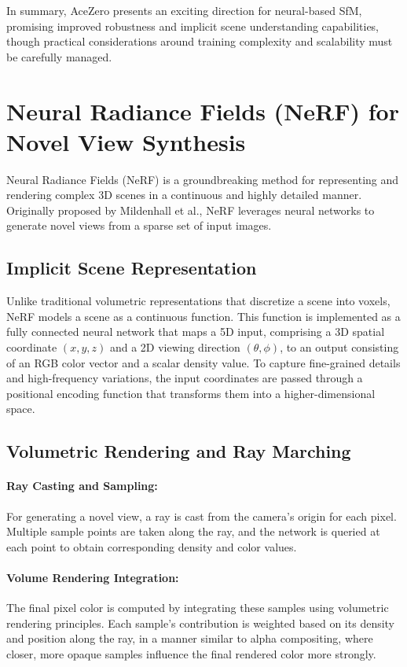 In summary, AceZero presents an exciting direction for neural-based SfM, promising improved robustness and implicit scene understanding capabilities, though practical considerations around training complexity and scalability must be carefully managed.

\section{Neural Radiance Fields (NeRF) for Novel View Synthesis}

Neural Radiance Fields (NeRF) \cite{mildenhall2020nerf} is a groundbreaking method for representing and rendering complex 3D scenes in a continuous and highly detailed manner. 
Originally proposed by Mildenhall et al., NeRF leverages neural networks to generate novel views from a sparse set of input images.

\subsection{Implicit Scene Representation}
Unlike traditional volumetric representations that discretize a scene into voxels, NeRF models a scene as a continuous function. 
This function is implemented as a fully connected neural network that maps a 5D input, comprising a 3D spatial coordinate $(x,y,z)$ and a 2D viewing direction $(\theta,\phi)$, to an output consisting of an RGB color vector and a scalar density value. 
To capture fine-grained details and high-frequency variations, the input coordinates are passed through a positional encoding function that transforms them into a higher-dimensional space.

\subsection{Volumetric Rendering and Ray Marching}
\paragraph{Ray Casting and Sampling:} For generating a novel view, a ray is cast from the camera's origin for each pixel. 
Multiple sample points are taken along the ray, and the network is queried at each point to obtain corresponding density and color values.  
\paragraph{Volume Rendering Integration:} The final pixel color is computed by integrating these samples using volumetric rendering principles. 
Each sample's contribution is weighted based on its density and position along the ray, in a manner similar to alpha compositing, where closer, more opaque samples influence the final rendered color more strongly.

